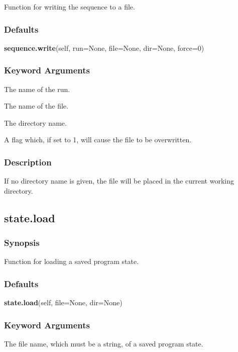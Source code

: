 Function for writing the sequence to a file.

\subsubsection{Defaults}

\textsf{\textbf{sequence.write}(self, run=None, file=None, dir=None, force=0)}


\subsubsection{Keyword Arguments}


  The name of the run.

  The name of the file.

  The directory name.

  A flag which, if set to 1, will cause the file to be overwritten.

\subsubsection{Description}

If no directory name is given, the file will be placed in the current working directory.


\newpage

\subsection{state.load}


\subsubsection{Synopsis}

Function for loading a saved program state.

\subsubsection{Defaults}

\textsf{\textbf{state.load}(self, file=None, dir=None)}


\subsubsection{Keyword Arguments}


  The file name, which must be a string, of a saved program state.

